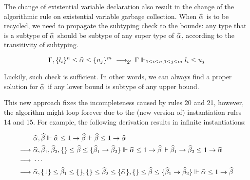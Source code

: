 The change of existential variable declaration also result in the change of
the algorithmic rule on existential variable garbage collection.
When $\al$ is to be recycled, we need to propagate the subtyping check to
the bounds: any type that is a subtype of $\al$ should be subtype of
any super type of $\al$, according to the transitivity of subtyping.

\begin{gather*}
    \begin{aligned}
\Gm, \{l_i\}^n \le \al \le \{u_j\}^m &\rrule{2'}
    \Gm \Vdash_{1 \le i \le n, 1 \le j \le m} l_i \le u_j\\
    \end{aligned}
\end{gather*}

Luckily, such check is sufficient. In other words,
we can always find a proper solution for $\al$ if any lower bound
is subtype of any upper bound.

This new approach fixes the incompleteness caused by rules 20 and 21,
however, the algorithm might loop forever due to the
(new version of) instantiation rules 14 and 15.
For example, the following derivation results in infinite instantiations:

\begin{gather*}
    \begin{aligned}
     & \al, \bt \Vdash \al \le 1 \to \bt \Vdash \bt \le 1 \to \al\\
\rto~& \al, \bt[1], \bt[2], \{\} \le \bt \le \{\bt[1] \to \bt[2]\}
        \Vdash \al \le 1 \to \bt \Vdash \bt[1] \to \bt[2] \le 1 \to \al\\
\rto~& \cdots\\
\rto~& \al, \{1\} \le \bt[1] \le \{\}, \{\} \le \bt[2] \le \{\al\},
        \{\} \le \bt \le \{\bt[1] \to \bt[2]\}
        \Vdash \al \le 1 \to \bt\\
    \end{aligned}
\end{gather*}

